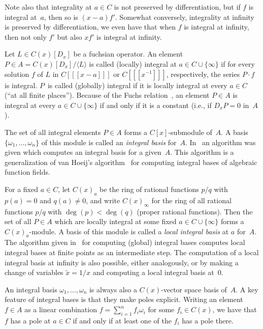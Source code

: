 \documentclass{sig-alternate}
\def\<#1>{\langle#1\rangle}
\begin{document}
Note also that integrality at $a\in C$ is not preserved by differentiation,
but if $f$ is integral at~$a$, then so is $(x-a)f'$. Somewhat conversely,
integrality at infinity is preserved by differentiation, we even have that
when $f$ is integral at infinity, then not only $f'$ but also $xf'$ is
integral at infinity. 

Let $L\in C(x)[D_x]$ be a fuchsian operator. An element $P\in A=C(x)[D_x]/\<L>$
is called (locally) integral at $a\in C\cup\{\infty\}$ if for every solution $f$
of $L$ in $C[[[x-a]]]$ or $C[[[x^{-1}]]]$, respectively, the series $P\cdot f$ is
integral. $P$~is called (globally) integral if it is locally integral at every
$a\in C$ (``at all finite places''). Because of the Fuchs relation~\cite{ince26}, an
element $P\in A$ is integral at every $a\in C\cup\{\infty\}$ if and only if it
is a constant (i.e., if $D_xP=0$ in~$A$).

The set of all integral elements $P\in A$ forms a $C[x]$-submodule of~$A$.
A basis $\{\omega_1,\dots,\omega_n\}$ of this module is called an \emph{integral basis}
for~$A$. In~\cite{kauers15b} an algorithm was given which computes an integral basis
for a given~$A$. This algorithm is a generalization of van Hoeij's
algorithm~\cite{vanHoeij94} for computing integral bases of algebraic function
fields.

For a fixed $a\in C$, let $C(x)_a$ be the ring of rational functions $p/q$
with $p(a)=0$ and $q(a)\neq0$, and write $C(x)_\infty$ for the ring of all
rational functions $p/q$ with $\deg(p)<\deg(q)$ (proper rational
functions). Then the set of all $P\in A$ which are locally integral at some
fixed $a\in C\cup\{\infty\}$ forms a $C(x)_a$-module. A basis of this module is
called a \emph{local integral basis} at $a$ for~$A$. The algorithm given in~\cite{kauers15b}
for computing (global) integral bases computes local integral bases at finite
points as an intermediate step. The computation of a local integral basis at
infinity is also possible, either analogously, or by making a change of
variables $\tilde x=1/x$ and computing a local integral basis at~$0$.

An integral basis $\omega_1,\dots,\omega_n$ is always also a $C(x)$-vector space
basis of~$A$. A key feature of integral bases is that they make poles explicit. Writing
an element $f\in A$ as a linear combination $f=\sum_{i=1}^n f_i\omega_i$ for some
$f_i\in C(x)$, we have that $f$ has a pole at $a\in C$ if and only if at least one
of the $f_i$ has a pole there.
\end{document}
